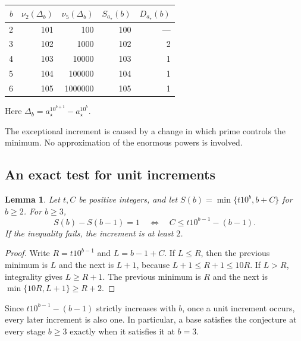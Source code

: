 \documentclass[11pt,a4paper]{article}
\newtheorem{lemma}[theorem]{Lemma}
\theoremstyle{definition}
\newcommand{\astar}{a_{\star}}
\begin{document}
\begin{center}
\begin{tabular}{rrrrr}
\toprule
$b$ & $\nu_2(\Delta_b)$ & $\nu_5(\Delta_b)$ & $S_{\astar}(b)$ & $D_{\astar}(b)$\\
\midrule
2 & 101 & 100 & 100 & ---\\
3 & 102 & 1000 & 102 & 2\\
4 & 103 & 10000 & 103 & 1\\
5 & 104 & 100000 & 104 & 1\\
6 & 105 & 1000000 & 105 & 1\\
\bottomrule
\end{tabular}\par\smallskip
{\small Here $\Delta_b=\astar^{10^{b+1}}-\astar^{10^b}$.}
\end{center}
The exceptional increment is caused by a change in which prime controls
the minimum. No approximation of the enormous powers is involved.

\subsection{An exact test for unit increments}
\begin{lemma}\label{lem:increment}
Let $t,C$ be positive integers, and let
$S(b)=\min\{t10^b,b+C\}$ for $b\ge2$. For $b\ge3$,
\begin{equation}\label{eq:criterion}
S(b)-S(b-1)=1
\quad\Longleftrightarrow\quad
C\le t10^{b-1}-(b-1).
\end{equation}
If the inequality fails, the increment is at least $2$.
\end{lemma}
\begin{proof}
Write $R=t10^{b-1}$ and $L=b-1+C$. If $L\le R$, then the previous
minimum is $L$ and the next is $L+1$, because $L+1\le R+1\le10R$.
If $L>R$, integrality gives $L\ge R+1$. The previous minimum is $R$ and
the next is $\min\{10R,L+1\}\ge R+2$.
\end{proof}

Since $t10^{b-1}-(b-1)$ strictly increases with $b$, once a unit increment
occurs, every later increment is also one. In particular, a base satisfies
the conjecture at every stage $b\ge3$ exactly when it satisfies it at $b=3$.
\end{document}
